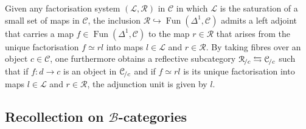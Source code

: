 \documentclass[reqno]{amsart}
\numberwithin{equation}{subsection}
\theoremstyle{plain}
\theoremstyle{definition}
\let\scr=\mathcal
\let\into=\hookrightarrow
\def\BB{\scr B}
\def\CC{\scr C}
\def\LL{\scr L}
\def\RR{\scr R}
\DeclareMathOperator{\Fun}{Fun}
\newcommand{\Over}[2]{#1_{\hspace{-1pt}/#2}}
\begin{document}
Given any factorisation system $(\LL,\RR)$ in $\CC$ in which $\LL$ is the saturation of a small set of maps in $\CC$, the inclusion $\RR\into\Fun(\Delta^1,\CC)$ admits a left adjoint that carries a map $f\in\Fun(\Delta^1,\CC)$ to the map $r\in\RR$ that arises from the unique factorisation $f\simeq rl$ into maps $l\in \LL$ and $r\in \RR$. By taking fibres over an object $c\in\CC$, one furthermore obtains a reflective subcategory $\Over{\RR}{c}\leftrightarrows\Over{\CC}{c}$ such that if $f\colon d\to c$ is an object in $\Over{\CC}{c}$ and if $f\simeq rl$ is its unique factorisation into maps $l\in \LL$ and $r\in \RR$, the adjunction unit is given by $l$.

\subsection{Recollection on $\BB$-categories}
\label{sec:recollection}
\end{document}
